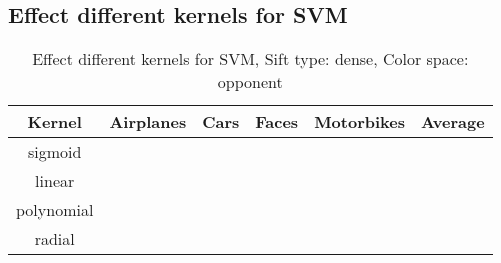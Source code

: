 \subsection{Effect different kernels for SVM}

\begin{table}[H]
\begin{tabular}{|c|ccccc|}
\hline
\textbf{Kernel} & \textbf{Airplanes} & \textbf{Cars} & \textbf{Faces} & \textbf{Motorbikes} & \textbf{Average}\\
\hline
sigmoid & & & & & \\
linear & & & & & \\
polynomial & & & & & \\
radial & & & & & \\
\hline
\end{tabular}
\caption{Effect different kernels for SVM, Sift type: dense, Color space: opponent}
\end{table}
